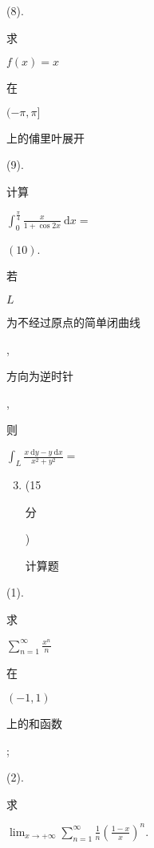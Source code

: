 \documentclass[10pt]{article}
\begin{document}
(8). \begin{CJK}{UTF8}{mj}求\end{CJK} $f(x)=x$ \begin{CJK}{UTF8}{mj}在\end{CJK} $(-\pi, \pi]$ \begin{CJK}{UTF8}{mj}上的俌里叶展开\end{CJK}

(9). \begin{CJK}{UTF8}{mj}计算\end{CJK} $\int_{0}^{\frac{\pi}{4}} \frac{x}{1+\cos 2 x} \mathrm{~d} x=$

$(10)$. \begin{CJK}{UTF8}{mj}若\end{CJK} $L$ \begin{CJK}{UTF8}{mj}为不经过原点的简单闭曲线\end{CJK}, \begin{CJK}{UTF8}{mj}方向为逆时针\end{CJK}, \begin{CJK}{UTF8}{mj}则\end{CJK} $\int_{L} \frac{x \mathrm{~d} y-y \mathrm{~d} x}{x^{2}+y^{2}}=$

\begin{enumerate}
  \setcounter{enumi}{2}
  \item (15 \begin{CJK}{UTF8}{mj}分\end{CJK}) \begin{CJK}{UTF8}{mj}计算题\end{CJK}
\end{enumerate}
(1). \begin{CJK}{UTF8}{mj}求\end{CJK} $\sum_{n=1}^{\infty} \frac{x^{n}}{n}$ \begin{CJK}{UTF8}{mj}在\end{CJK} $(-1,1)$ \begin{CJK}{UTF8}{mj}上的和函数\end{CJK};

(2). \begin{CJK}{UTF8}{mj}求\end{CJK} $\lim _{x \rightarrow+\infty} \sum_{n=1}^{\infty} \frac{1}{n}\left(\frac{1-x}{x}\right)^{n}$.
\end{document}
